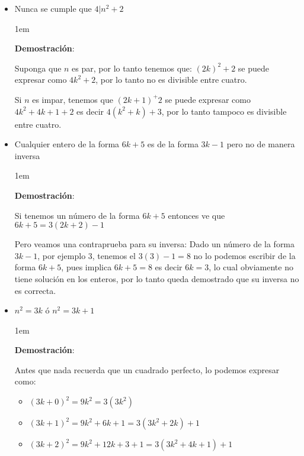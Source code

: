 \documentclass[12pt, fleqn]{report}                             %
\newenvironment{SmallIndentation}[1][0.75em]                    %
    {\begin{adjustwidth}{#1}{}\begin{footnotesize}}                 %
    {\end{footnotesize}\end{adjustwidth}}                           %
\begin{document}
\begin{itemize}
\begin{SmallIndentation}[1em]
                \end{SmallIndentation}

            \item Nunca se cumple que $4|n^2 +2$

                \begin{SmallIndentation}[1em]
                    \textbf{Demostración}:

                    Suponga que $n$ es par, por lo tanto tenemos que:
                    $(2k)^2+2$ se puede expresar como $4k^2 + 2$, por lo tanto no es divisible entre
                    cuatro.

                    Si $n$ es impar, tenemos que $(2k+1)^+2$ se puede expresar como $4k^2 + 4k + 1 + 2$
                    es decir $4(k^2+k) +3$, por lo tanto tampoco es divisible entre cuatro.

                \end{SmallIndentation}

            \item Cualquier entero de la forma $6k+5$ es de la forma $3k-1$ pero no de manera inversa

                \begin{SmallIndentation}[1em]
                    \textbf{Demostración}:

                    Si tenemos un número de la forma $6k+5$ entonces ve que $6k+5 = 3(2k+2)-1$

                    Pero veamos una contraprueba para su inversa:
                    Dado un número de la forma $3k-1$, por ejemplo 3, tenemos el $3(3)-1=8$ no lo
                    podemos escribir de la forma $6k+5$, pues implica $6k+5=8$ es decir
                    $6k=3$, lo cual obviamente no tiene solución en los enteros, por lo tanto
                    queda demostrado que su inversa no es correcta.
                    
                \end{SmallIndentation}

            \item $n^2 = 3k$ ó $n^2 = 3k + 1$

                \begin{SmallIndentation}[1em]
                    \textbf{Demostración}:

                    Antes que nada recuerda que un cuadrado perfecto, lo podemos expresar como:
                    \begin{itemize}
                        \item $(3k+0)^2 = 9k^2 = 3(3k^2)$
                        \item $(3k+1)^2 = 9k^2 + 6k + 1 = 3(3k^2 + 2k) + 1$
                        \item $(3k+2)^2 = 9k^2 + 12k + 3 +1 = 3(3k^2 + 4k + 1) + 1$
                    \end{itemize}


\end{SmallIndentation}
\end{itemize}
\end{document}
